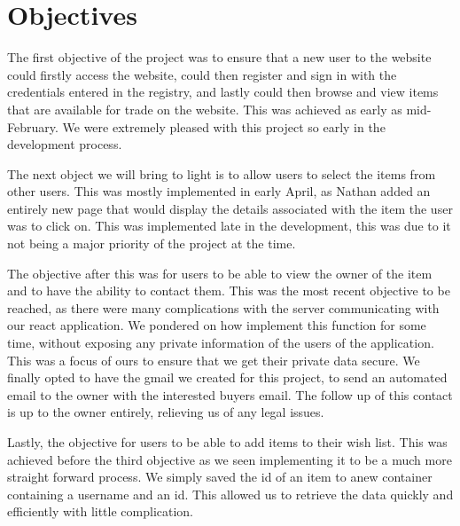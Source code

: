 \section{Objectives}
The first objective of the project was to ensure that a new user to the website could firstly access the website, could then register and sign in with the credentials entered in the registry, and lastly could then browse and view items that are available for trade on the website. This was achieved as early as mid-February. We were extremely pleased with this project so early in the development process. \par
The next object we will bring to light is to allow users to select the items from other users. This was mostly implemented in early April, as Nathan added an entirely new page that would display the details associated with the item the user was to click on. This was implemented late in the development, this was due to it not being a major priority of the project at the time. \par
The objective after this was for users to be able to view the owner of the item and to have the ability to contact them. This was the most recent objective to be reached, as there were many complications with the server communicating with our react application. We pondered on how implement this function for some time, without exposing any private information of the users of the application. This was a focus of ours to ensure that we get their private data secure. We finally opted to have the gmail we created for this project, to send an automated email to the owner with the interested buyers email. The follow up of this contact is up to the owner entirely, relieving us of any legal issues. \par
Lastly, the objective for users to be able to add items to their wish list. This was achieved before the third objective as we seen implementing it to be a much more straight forward process. We simply saved the id of an item to anew container containing a username and an id. This allowed us to retrieve the data quickly and efficiently with little complication. \par

